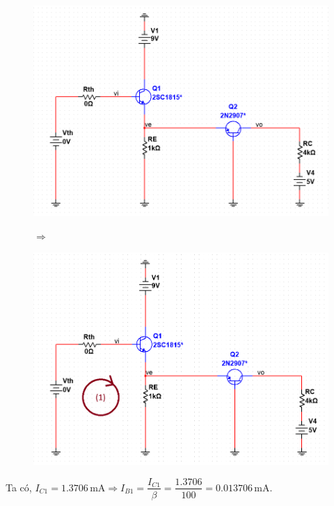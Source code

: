 \begin{figure}[H]
	\centering
	\begin{minipage}{.4\linewidth}
		\includegraphics[width=\linewidth]{./my-chapters/my-images/Question5/b_phancuc_R1_R2.png}
	\end{minipage}
	\begin{minipage}{.1\linewidth}
		$\Rightarrow$
	\end{minipage}
	\begin{minipage}{.4\linewidth}
		\includegraphics[width=\linewidth]{./my-chapters/my-images/Question5/b_phancuc_thevenin.png}
	\end{minipage}
\end{figure}

Ta có, $I_{C1} = 1.3706\,\text{mA} \Rightarrow I_{B1} = \dfrac{I_{C1}}{\beta} = \dfrac{1.3706}{100} = 0.013706\,\text{mA}$.


